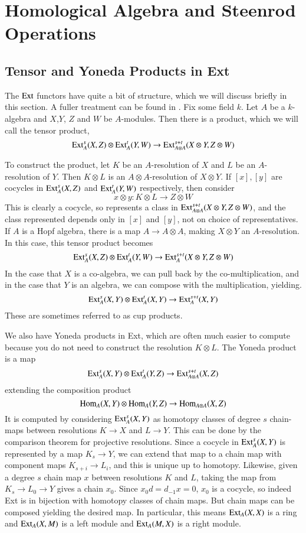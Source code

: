 

\section{Homological Algebra and Steenrod Operations}

\subsection{Tensor and Yoneda Products in Ext}
\label{sec:ExtStructure}

The $\operatorname{Ext}\nolimits$ functors have quite a bit of structure, which we will discuss briefly in this section.  A fuller treatment can be found in \cite{cartan}.
Fix some field $k$. 
Let $A$ be a $k$-algebra and $X$,$Y$, $Z$ and $W$ be $A$-modules.
Then there is a product, which we will call the tensor product, 
\[\operatorname{Ext}\nolimits^s_A(X,Z)\otimes \operatorname{Ext}\nolimits^t_A(Y,W)\to \operatorname{Ext}\nolimits^{s+t}_{A\otimes A}(X\otimes Y,Z\otimes W)\]

To construct the product, let $K$ be an  $A$-resolution of $X$ and $L$ be an  $A$-resolution of $Y$.  
Then $K\otimes L$ is an $A\otimes A$-resolution of $X\otimes Y$.  
If $[x],[y]$ are cocycles in $\operatorname{Ext}\nolimits^s_A(X,Z)$ and $\operatorname{Ext}\nolimits^t_A(Y,W)$ respectively, then consider
\[x\otimes y : K\otimes L \to Z\otimes W\]
This is clearly a cocycle, so represents a class in $\operatorname{Ext}\nolimits^{s+t}_{A\otimes A}(X\otimes Y,Z\otimes W)$, and the class represented depends only in $[x]$ and $[y]$, not on choice of representatives. If $A$ is a Hopf algebra, there is a map $A\to A\otimes A$, making $X\otimes Y$ an $A$-resolution.  In this case, this tensor product becomes
\[\operatorname{Ext}\nolimits^s_A(X,Z)\otimes \operatorname{Ext}\nolimits^t_A(Y,W)\to \operatorname{Ext}\nolimits^{s+t}_{A}(X\otimes Y,Z\otimes W)\]
In the case that $X$ is a co-algebra, we can pull back by the co-multiplication, and in the case that $Y$ is an algebra, we can compose with the multiplication, yielding.  
\[\operatorname{Ext}\nolimits^s_A(X,Y)\otimes \operatorname{Ext}\nolimits^t_A(X,Y)\to \operatorname{Ext}\nolimits^{s+t}_{A}(X,Y)\]
These are sometimes referred to as cup products.  

We also have Yoneda products in Ext, which are often much easier to compute because you do not need to construct the resolution $K\otimes L$.  
The Yoneda product is a map
\[\operatorname{Ext}\nolimits^s_A(X,Y)\otimes \operatorname{Ext}\nolimits^t_A(Y,Z)\to \operatorname{Ext}\nolimits^{s+t}_{A\otimes A}(X,Z)\]
extending the composition product
\[\operatorname{Hom}\nolimits_A(X,Y)\otimes \operatorname{Hom}\nolimits_A(Y,Z)\to \operatorname{Hom}\nolimits_{A\otimes A}(X,Z)\]
It is computed by considering $\operatorname{Ext}\nolimits^s_A(X,Y)$ as homotopy classes of degree $s$ chain-maps between resolutions $K\to X$ and $L\to Y$.  
This can be done by the comparison theorem for projective resolutions.  
Since a cocycle in $\operatorname{Ext}\nolimits^s_A(X,Y)$ is represented by a map $K_s\to Y$, we can extend that map to a chain map with component maps $K_{s+i}\to L_i$, and this is unique up to homotopy.  
Likewise, given a degree $s$ chain map $x$ between resolutions $K$ and $L$, taking the map from $K_s\to L_0\to Y$ gives a chain $x_0$.  Since $x_0d=d_{-1}x=0$, $x_0$ is a cocycle, so indeed Ext is in bijection with homotopy classes of chain maps.  
But chain maps can be composed yielding the desired map.
In particular, this means $\operatorname{Ext}\nolimits_A(X,X)$ is a ring and $\operatorname{Ext}\nolimits_A(X,M)$ is a left module and $\operatorname{Ext}\nolimits_A(M,X)$ is a right module.  



